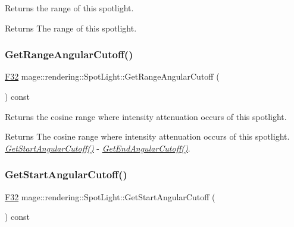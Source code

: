 Returns the range of this spotlight.

\begin{DoxyReturn}{Returns}
The range of this spotlight. 
\end{DoxyReturn}
\hypertarget{classmage_1_1rendering_1_1_spot_light_abd442757ce094619b8f4c050e54403e1}{}\label{classmage_1_1rendering_1_1_spot_light_abd442757ce094619b8f4c050e54403e1} 
\subsubsection{\texorpdfstring{Get\+Range\+Angular\+Cutoff()}{GetRangeAngularCutoff()}}
{\footnotesize\ttfamily \hyperlink{namespacemage_aa97e833b45f06d60a0a9c4fc22ae02c0}{F32} mage\+::rendering\+::\+Spot\+Light\+::\+Get\+Range\+Angular\+Cutoff (\begin{DoxyParamCaption}{ }\end{DoxyParamCaption}) const\hspace{0.3cm}{\ttfamily [noexcept]}}

Returns the cosine range where intensity attenuation occurs of this spotlight.

\begin{DoxyReturn}{Returns}
The cosine range where intensity attenuation occurs of this spotlight. {\itshape \hyperlink{classmage_1_1rendering_1_1_spot_light_ab865663954e848ad42c84e759c7ceea7}{Get\+Start\+Angular\+Cutoff()}} -\/ {\itshape \hyperlink{classmage_1_1rendering_1_1_spot_light_aab94a7a9d5434d8e7913d7b52379841b}{Get\+End\+Angular\+Cutoff()}}. 
\end{DoxyReturn}
\hypertarget{classmage_1_1rendering_1_1_spot_light_ab865663954e848ad42c84e759c7ceea7}{}\label{classmage_1_1rendering_1_1_spot_light_ab865663954e848ad42c84e759c7ceea7} 
\subsubsection{\texorpdfstring{Get\+Start\+Angular\+Cutoff()}{GetStartAngularCutoff()}}
{\footnotesize\ttfamily \hyperlink{namespacemage_aa97e833b45f06d60a0a9c4fc22ae02c0}{F32} mage\+::rendering\+::\+Spot\+Light\+::\+Get\+Start\+Angular\+Cutoff (\begin{DoxyParamCaption}{ }\end{DoxyParamCaption}) const\hspace{0.3cm}{\ttfamily [noexcept]}}


